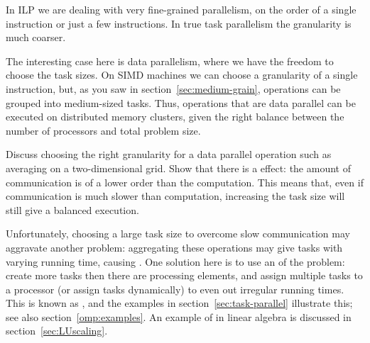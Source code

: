 In \ac{ILP} we are dealing with very fine-grained parallelism, on the
order of a single instruction or just a few instructions. In true task
parallelism the granularity is much coarser.

The interesting case here is data parallelism, where we have the
freedom to choose the task sizes. On \ac{SIMD} machines we can choose
a granularity of a single instruction, but, as you saw in
section~\ref{sec:medium-grain}, operations can be grouped into
medium-sized tasks. Thus, operations that are data parallel can be
executed on distributed memory clusters, given the right balance
between the number of processors and total problem size.

\begin{exercise}
  Discuss choosing the right granularity for a data parallel operation
  such as averaging on a two-dimensional grid. Show that there is a
   effect: the amount of communication is
  of a lower order than the computation. This means that, even if
  communication is much slower than computation, increasing the task
  size will still give a balanced execution.
\end{exercise}

Unfortunately, choosing a large task size to overcome slow
communication may aggravate another problem: aggregating these
operations may give tasks with varying running time, causing
.  One solution here is to use an
 of the problem: create more tasks then
there are processing elements, and assign multiple tasks to a
processor (or assign tasks dynamically) to even out irregular running
times. This is known as ,
and the examples in section~\ref{sec:task-parallel} illustrate this;
see also section~\ref{omp:examples}.
An example of  in linear algebra is
discussed in section~\ref{sec:LUscaling}.


